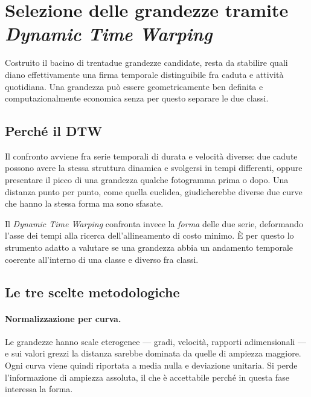 
\section{Selezione delle grandezze tramite \emph{Dynamic Time Warping}}
\label{sec:dtw}

Costruito il bacino di trentadue grandezze candidate, resta da stabilire quali
diano effettivamente una firma temporale distinguibile fra caduta e attività
quotidiana. Una grandezza può essere geometricamente ben definita e
computazionalmente economica senza per questo separare le due classi.

\subsection{Perché il DTW}

Il confronto avviene fra serie temporali di durata e velocità diverse: due
cadute possono avere la stessa struttura dinamica e svolgersi in tempi
differenti, oppure presentare il picco di una grandezza qualche fotogramma prima
o dopo. Una distanza punto per punto, come quella euclidea, giudicherebbe
diverse due curve che hanno la stessa forma ma sono sfasate.

Il \emph{Dynamic Time Warping} confronta invece la \emph{forma} delle due serie,
deformando l'asse dei tempi alla ricerca dell'allineamento di costo minimo. È
per questo lo strumento adatto a valutare se una grandezza abbia un andamento
temporale coerente all'interno di una classe e diverso fra classi.

\subsection{Le tre scelte metodologiche}

\paragraph{Normalizzazione per curva.} Le grandezze hanno scale eterogenee —
gradi, velocità, rapporti adimensionali — e sui valori grezzi la distanza
sarebbe dominata da quelle di ampiezza maggiore. Ogni curva viene quindi
riportata a media nulla e deviazione unitaria. Si perde l'informazione di
ampiezza assoluta, il che è accettabile perché in questa fase interessa la
forma.

